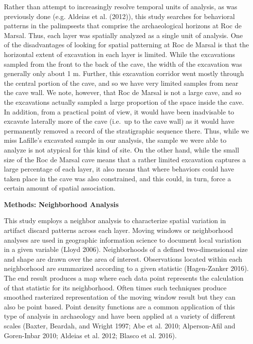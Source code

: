\documentclass[smallextended]{svjour3}       %
\begin{document}
Rather than attempt to increasingly resolve temporal units of analysis,
as was previously done (e.g. Aldeias et al. (2012)), this study searches
for behavioral patterns in the palimpsests that comprise the
archaeological horizons at Roc de Marsal. Thus, each layer was spatially
analyzed as a single unit of analysis. One of the disadvantages of
looking for spatial patterning at Roc de Marsal is that the horizontal
extent of excavation in each layer is limited. While the excavations
sampled from the front to the back of the cave, the width of the
excavation was generally only about 1 m. Further, this excavation
corridor went mostly through the central portion of the cave, and so we
have very limited samples from near the cave wall. We note, however,
that Roc de Marsal is not a large cave, and so the excavations actually
sampled a large proportion of the space inside the cave. In addition,
from a practical point of view, it would have been inadvisable to
excavate laterally more of the cave (i.e.~up to the cave wall) as it
would have permanently removed a record of the stratigraphic sequence
there. Thus, while we miss Lafille's excavated sample in our analysis,
the sample we were able to analyze is not atypical for this kind of
site. On the other hand, while the small size of the Roc de Marsal cave
means that a rather limited excavation captures a large percentage of
each layer, it also means that where behaviors could have taken place in
the cave was also constrained, and this could, in turn, force a certain
amount of spatial association.

\textbf{Methods: Neighborhood Analysis}

This study employs a neighbor analysis to characterize spatial variation
in artifact discard patterns across each layer. Moving windows or
neighborhood analyses are used in geographic information science to
document local variation in a given variable (Lloyd 2006). Neighborhoods
of a defined two-dimensional size and shape are drawn over the area of
interest. Observations located within each neighborhood are summarized
according to a given statistic (Hagen-Zanker 2016). The end result
produces a map where each data point represents the calculation of that
statistic for its neighborhood. Often times such techniques produce
smoothed rasterized representation of the moving window result but they
can also be point based. Point density functions are a common
application of this type of analysis in archaeology and have been
applied at a variety of different scales (Baxter, Beardah, and Wright
1997; Abe et al. 2010; Alperson-Afil and Goren-Inbar 2010; Aldeias et
al. 2012; Blasco et al. 2016).
\end{document}

